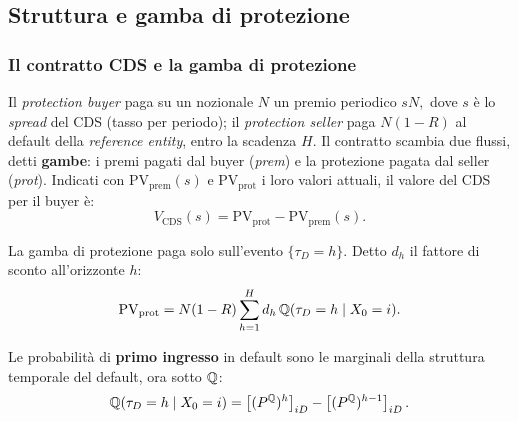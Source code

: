

\subsection{Struttura e gamba di protezione}%

\begin{frame}%
%

\frametitle{Il contratto CDS e la gamba di protezione}%
%

%


Il \emph{protection buyer} paga su un nozionale $N$ un premio periodico $sN,$
dove $s$ \`{e} lo \emph{spread} del CDS (tasso per periodo); il
\emph{protection seller} paga $N(1-R)$ al default della \emph{reference
entity}, entro la scadenza $H$. Il contratto scambia due flussi, detti
\textbf{gambe}: i premi pagati dal buyer (\emph{prem}) e la protezione pagata
dal seller (\emph{prot}). Indicati con $\mathrm{PV}_{\mathrm{prem}}(s)$ e
$\mathrm{PV}_{\mathrm{prot}}$ i loro valori attuali, il valore del CDS per il
buyer \`{e}:
\[
V_{\mathrm{CDS}}(s)=\mathrm{PV}_{\mathrm{prot}}-\mathrm{PV}_{\mathrm{prem}%
}(s).
\]


\begin{stepitemize}
\item La gamba di protezione paga solo sull'evento $\{\tau_{D}=h\}.$ Detto
$d_{h}$ il fattore di sconto all'orizzonte $h$:
\[
\mathrm{PV}_{\mathrm{prot}}=N(1-R)\sum_{h=1}^{H}d_{h}\,\mathbb{Q}(\tau_{D}=h\mid
X_{0}=i).
\]


\item Le probabilit\`{a} di \textbf{primo ingresso} in default sono le
marginali della struttura temporale del default, ora sotto $\mathbb{Q}$:
\[
\mathbb{Q}(\tau_{D}=h\mid X_{0}=i)=\left[  (P^{\mathbb{Q}})^{h}\right]  _{iD}-\left[
(P^{\mathbb{Q}})^{h-1}\right]  _{iD}.
\]

\end{stepitemize}

%

\transboxout
\end{frame}%



